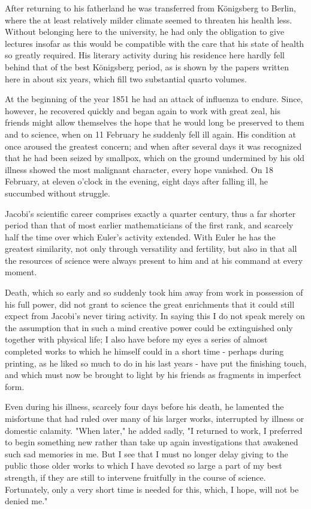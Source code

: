 \documentclass[11pt]{article}
\begin{document}
After returning to his fatherland he was transferred from Königsberg to Berlin, where the at least relatively milder climate seemed to threaten his health less. Without belonging here to the university, he had only the obligation to give lectures insofar as this would be compatible with the care that his state of health so greatly required. His literary activity during his residence here hardly fell behind that of the best Königsberg period, as is shown by the papers written here in about six years, which fill two substantial quarto volumes.

At the beginning of the year 1851 he had an attack of influenza to endure. Since, however, he recovered quickly and began again to work with great zeal, his friends might allow themselves the hope that he would long be preserved to them and to science, when on 11 February he suddenly fell ill again. His condition at once aroused the greatest concern; and when after several days it was recognized that he had been seized by smallpox, which on the ground undermined by his old illness showed the most malignant character, every hope vanished. On 18 February, at eleven o'clock in the evening, eight days after falling ill, he succumbed without struggle.

Jacobi's scientific career comprises exactly a quarter century, thus a far shorter period than that of most earlier mathematicians of the first rank, and scarcely half the time over which Euler's activity extended. With Euler he has the greatest similarity, not only through versatility and fertility, but also in that all the resources of science were always present to him and at his command at every moment.

Death, which so early and so suddenly took him away from work in possession of his full power, did not grant to science the great enrichments that it could still expect from Jacobi's never tiring activity. In saying this I do not speak merely on the assumption that in such a mind creative power could be extinguished only together with physical life; I also have before my eyes a series of almost completed works to which he himself could in a short time - perhaps during printing, as he liked so much to do in his last years - have put the finishing touch, and which must now be brought to light by his friends as fragments in imperfect form.

Even during his illness, scarcely four days before his death, he lamented the misfortune that had ruled over many of his larger works, interrupted by illness or domestic calamity. "When later," he added sadly, "I returned to work, I preferred to begin something new rather than take up again investigations that awakened such sad memories in me. But I see that I must no longer delay giving to the public those older works to which I have devoted so large a part of my best strength, if they are still to intervene fruitfully in the course of science. Fortunately, only a very short time is needed for this, which, I hope, will not be denied me."
\end{document}
